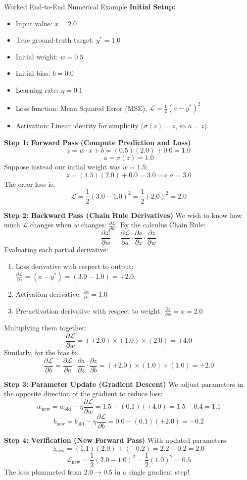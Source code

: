 \begin{mathbox}{Worked End-to-End Numerical Example}
\textbf{Initial Setup:}
\begin{itemize}
    \item Input value: $x = 2.0$
    \item True ground-truth target: $y^* = 1.0$
    \item Initial weight: $w = 0.5$
    \item Initial bias: $b = 0.0$
    \item Learning rate: $\eta = 0.1$
    \item Loss function: Mean Squared Error (MSE), $\mathcal{L} = \frac{1}{2}(a - y^*)^2$
    \item Activation: Linear identity for simplicity ($\sigma(z) = z$, so $a = z$).
\end{itemize}

\textbf{Step 1: Forward Pass (Compute Prediction and Loss)}
\[
z = w \cdot x + b = (0.5)(2.0) + 0.0 = 1.0
\]
\[
a = \sigma(z) = 1.0
\]
Suppose instead our initial weight was $w = 1.5$:
\[
z = (1.5)(2.0) + 0.0 = 3.0 \implies a = 3.0
\]
The error loss is:
\[
\mathcal{L} = \frac{1}{2}(3.0 - 1.0)^2 = \frac{1}{2}(2.0)^2 = 2.0
\]

\textbf{Step 2: Backward Pass (Chain Rule Derivatives)}
We wish to know how much $\mathcal{L}$ changes when $w$ changes: $\frac{\partial \mathcal{L}}{\partial w}$.
By the calculus Chain Rule:
\[
\frac{\partial \mathcal{L}}{\partial w} = \frac{\partial \mathcal{L}}{\partial a} \cdot \frac{\partial a}{\partial z} \cdot \frac{\partial z}{\partial w}
\]
Evaluating each partial derivative:
\begin{enumerate}
    \item Loss derivative with respect to output: $\frac{\partial \mathcal{L}}{\partial a} = (a - y^*) = (3.0 - 1.0) = +2.0$
    \item Activation derivative: $\frac{\partial a}{\partial z} = 1.0$
    \item Pre-activation derivative with respect to weight: $\frac{\partial z}{\partial w} = x = 2.0$
\end{enumerate}
Multiplying them together:
\[
\frac{\partial \mathcal{L}}{\partial w} = (+2.0) \times (1.0) \times (2.0) = +4.0
\]
Similarly, for the bias $b$:
\[
\frac{\partial \mathcal{L}}{\partial b} = \frac{\partial \mathcal{L}}{\partial a} \cdot \frac{\partial a}{\partial z} \cdot \frac{\partial z}{\partial b} = (+2.0) \times (1.0) \times (1.0) = +2.0
\]

\textbf{Step 3: Parameter Update (Gradient Descent)}
We adjust parameters in the opposite direction of the gradient to reduce loss:
\[
w_{\text{new}} = w_{\text{old}} - \eta \frac{\partial \mathcal{L}}{\partial w} = 1.5 - (0.1)(+4.0) = 1.5 - 0.4 = 1.1
\]
\[
b_{\text{new}} = b_{\text{old}} - \eta \frac{\partial \mathcal{L}}{\partial b} = 0.0 - (0.1)(+2.0) = -0.2
\]

\textbf{Step 4: Verification (New Forward Pass)}
With updated parameters:
\[
z_{\text{new}} = (1.1)(2.0) + (-0.2) = 2.2 - 0.2 = 2.0
\]
\[
\mathcal{L}_{\text{new}} = \frac{1}{2}(2.0 - 1.0)^2 = \frac{1}{2}(1.0)^2 = 0.5
\]
The loss plummeted from $2.0 \to 0.5$ in a single gradient step!
\end{mathbox}

